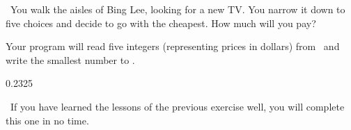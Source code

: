 
\Question\ You walk the aisles of Bing Lee, looking for a new TV. You narrow it down to
five choices and decide to go with the cheapest. How much will you pay?

Your program will read five integers (representing prices in dollars) from \IN\ and write
the smallest number to \OUT.

\Sample

       {0.2}{325}

\Scratch\ If you have learned the lessons of the previous exercise well, you will complete
this one in no time.

